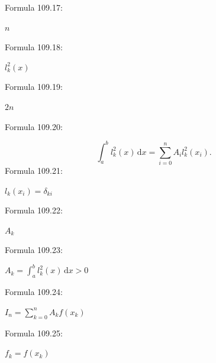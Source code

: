 \documentclass[11pt]{article}
\begin{document}
\noindent Formula 109.17:\par
$n$\par
\noindent Formula 109.18:\par
$l_k^2(x)$\par
\noindent Formula 109.19:\par
$2n$\par
\noindent Formula 109.20:\par
\[
\int_a^b l_k^2(x)\,\mathrm{d}x=\sum_{i=0}^{n}A_i l_k^2(x_i).
\]
\noindent Formula 109.21:\par
$l_k(x_i)=\delta_{ki}$\par
\noindent Formula 109.22:\par
$A_k$\par
\noindent Formula 109.23:\par
$\displaystyle A_k=\int_a^b l_k^2(x)\,\mathrm{d}x>0$\par
\noindent Formula 109.24:\par
$\displaystyle I_n=\sum_{k=0}^{n}A_kf(x_k)$\par
\noindent Formula 109.25:\par
$f_k=f(x_k)$\par
\clearpage
\end{document}
